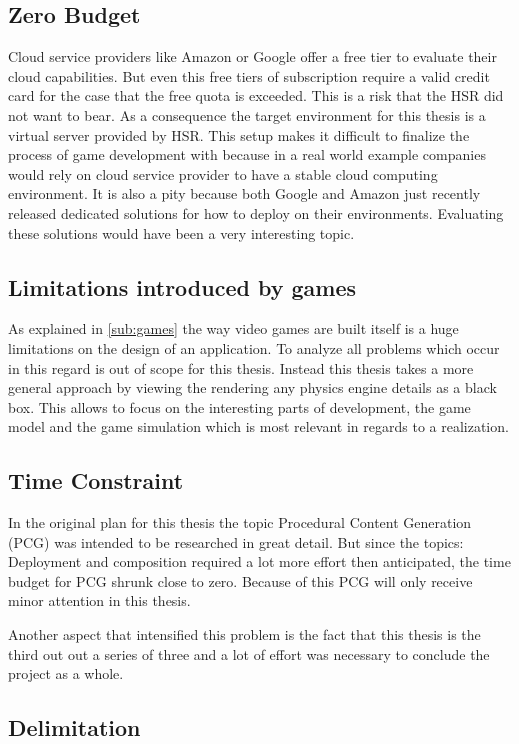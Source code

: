 \subsection{Zero Budget}
\label{sub:zero_buget}
Cloud service providers like Amazon or Google offer a free tier to evaluate
their cloud capabilities. But even this free tiers of subscription require a
valid credit card for the case that the free quota is exceeded. This is a risk
that the HSR did not want to bear. As a consequence the target environment for
this thesis is a virtual server provided by HSR. This setup makes it difficult
to finalize the process of game development with \mss{} because in a real world
example companies would rely on cloud service provider to have a stable cloud
computing environment. It is also a pity because both Google and Amazon just
recently released dedicated solutions for how to deploy \ogs{} on their
environments. Evaluating these solutions would have been a very interesting
topic.

\subsection{Limitations introduced by games}
As explained in \autoref{sub:games} the way video games are built itself is a
huge limitations on the design of an \og{} application. To analyze all problems
which occur in this regard is out of scope for this thesis. Instead this thesis
takes a more general approach by viewing the rendering any physics engine
details as a black box. This allows to focus on the interesting parts of \og{}
development, the game model and the game simulation which is most relevant in
regards to a \ms{} realization.

\subsection{Time Constraint}
In the original plan for this thesis the topic Procedural Content Generation
(PCG) was intended to be researched in great detail. But since the topics:
Deployment and composition required a lot more effort then anticipated, the time
budget for PCG shrunk close to zero. Because of this PCG will only receive minor
attention in this thesis.

Another aspect that intensified this problem is the fact that this thesis is the
third out out a series of three and a lot of effort was necessary to conclude
the project as a whole.

\subsection{Delimitation}
\label{sub:delimitations}

